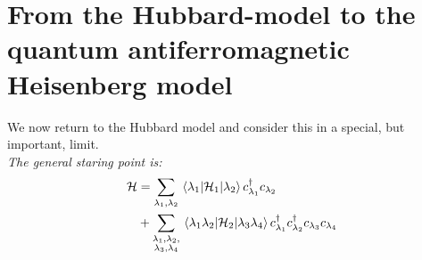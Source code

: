 \chapter{From the Hubbard-model to the quantum antiferromagnetic Heisenberg model}

We now return to the Hubbard model and consider this in a special, but important, limit.\\

\emph{The general staring point is:}
\begin{align}
\begin{split}
    \mathcal{H} &= \sum_{\lambda_1,\lambda_2} \mel{\lambda_1}{\mathcal{H}_1}{\lambda_2}c_{\lambda_1}^{\dagger} c_{\lambda_2} \\
    &+ \sum_{\substack{\lambda_1, \lambda_2, \\
    \lambda_3, \lambda_4}} \mel{\lambda_1 \lambda_2}{\mathcal{H}_2}{\lambda_3 \lambda_4}c_{\lambda_1}^\dagger c_{\lambda_2}^\dagger c_{\lambda_3} c_{\lambda_4}
\end{split}
\end{align}


